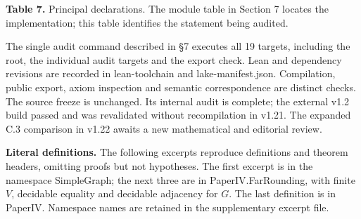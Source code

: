 \documentclass[english,11pt,a4paper]{article}
\begin{document}
\textbf{Table 7.} Principal declarations. The module table in Section 7 locates the implementation; this table identifies the statement being audited.

The single audit command described in §7 executes all 19 targets, including the root, the individual audit targets and the export check. Lean and dependency revisions are recorded in lean-toolchain and lake-manifest.json. Compilation, public export, axiom inspection and semantic correspondence are distinct checks. The source freeze is unchanged. Its internal audit is complete; the external v1.2 build passed and was revalidated without recompilation in v1.21. The expanded C.3 comparison in v1.22 awaits a new mathematical and editorial review.

\textbf{Literal definitions.} The following excerpts reproduce definitions and theorem headers, omitting proofs but not hypotheses. The first excerpt is in the namespace {\ttfamily\small SimpleGraph}; the next three are in {\ttfamily\small PaperIV.\discretionary{\hbox{\ensuremath{\hookrightarrow}}}{}{}FarRounding}, with finite \(V\), decidable equality and decidable adjacency for \(G\). The last definition is in {\ttfamily\small PaperIV}. Namespace names are retained in the supplementary excerpt file.
\end{document}
